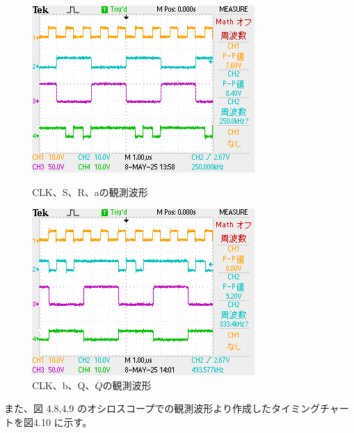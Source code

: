 \documentclass{jlreq}
\numberwithin{equation}{section}
\begin{document}
\begin{figure}[H]
  \centering
  \begin{minipage}{0.48\textwidth}
    \centering
    \includegraphics[width=\textwidth]{assets/srff01.png}
    \caption{CLK、S、R、aの観測波形}
  \end{minipage}
  \hfill
  \begin{minipage}{0.48\textwidth}
    \centering
    \includegraphics[width=\textwidth]{assets/srff02.png}
    \caption{CLK、b、Q、\(\overline{Q}\)の観測波形}
  \end{minipage}
\end{figure}

また、図 4.8,4.9 のオシロスコープでの観測波形より作成したタイミングチャートを図4.10 に示す。
\end{document}
